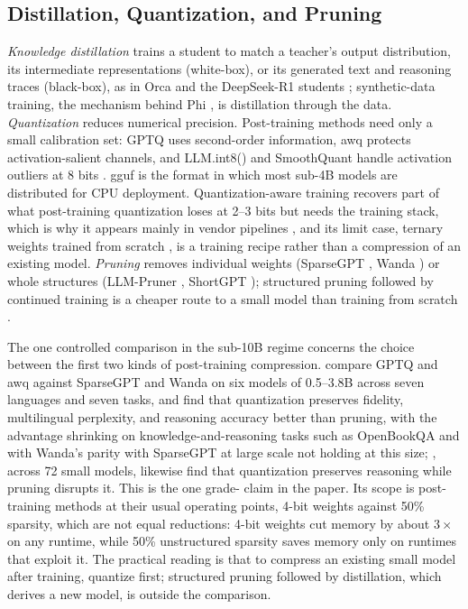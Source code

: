 \subsection{Distillation, Quantization, and Pruning}
\label{subsec:compression_kd}
\label{subsec:compression_quantization}
\label{subsec:compression_pruning}

\emph{Knowledge distillation} \citep{hinton2015distilling} trains a student to match a teacher's output distribution, its intermediate representations (white-box), or its generated text and reasoning traces (black-box), as in Orca \citep{mukherjee2023orca} and the DeepSeek-R1 students \citep{deepseek2025r1}; synthetic-data training, the mechanism behind Phi \citep{gunasekar2023phi1}, is distillation through the data. \emph{Quantization} reduces numerical precision. Post-training methods need only a small calibration set: GPTQ \citep{frantar2023gptq} uses second-order information, \gls{awq} \citep{lin2024awq} protects activation-salient channels, and LLM.int8() and SmoothQuant handle activation outliers at 8 bits \citep{dettmers2022llmint8,xiao2023smoothquant}. \gls{gguf} \citep{gerganov2023llamacpp} is the format in which most sub-4B models are distributed for CPU deployment. Quantization-aware training recovers part of what post-training quantization loses at 2--3 bits but needs the training stack, which is why it appears mainly in vendor pipelines \citep{gunter2025afm}, and its limit case, ternary weights trained from scratch \citep{ma2024bitnet158}, is a training recipe rather than a compression of an existing model. \emph{Pruning} removes individual weights (SparseGPT \citep{frantar2023sparsegpt}, Wanda \citep{sun2024wanda}) or whole structures (LLM-Pruner \citep{ma2023llmpruner}, ShortGPT \citep{men2024shortgpt}); structured pruning followed by continued training is a cheaper route to a small model than training from scratch \citep{xia2024sheared}.

The one controlled comparison in the sub-10B regime concerns the choice between the first two kinds of post-training compression. \citet{kurz2025pruning_vs_quant} compare GPTQ and \gls{awq} against SparseGPT and Wanda on six models of 0.5--3.8B across seven languages and seven tasks, and find that quantization preserves fidelity, multilingual perplexity, and reasoning accuracy better than pruning, with the advantage shrinking on knowledge-and-reasoning tasks such as OpenBookQA and with Wanda's parity with SparseGPT at large scale not holding at this size; \citet{srivastava2025thinkslm}, across 72 small models, likewise find that quantization preserves reasoning while pruning disrupts it. This is the one grade-\evA{} claim in the paper. Its scope is post-training methods at their usual operating points, 4-bit weights against 50\% sparsity, which are not equal reductions: 4-bit weights cut memory by about $3\times$ on any runtime, while 50\% unstructured sparsity saves memory only on runtimes that exploit it. The practical reading is that to compress an existing small model after training, quantize first; structured pruning followed by distillation, which derives a new model, is outside the comparison.

